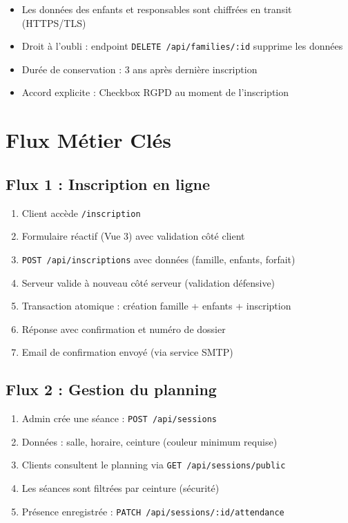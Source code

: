 \documentclass[11pt,a4paper]{article}
\begin{document}
\begin{itemize}
  \item Les données des enfants et responsables sont chiffrées en transit (HTTPS/TLS)
  \item Droit à l'oubli : endpoint \texttt{DELETE /api/families/:id} supprime les données
  \item Durée de conservation : 3 ans après dernière inscription
  \item Accord explicite : Checkbox RGPD au moment de l'inscription
\end{itemize}

\section{Flux Métier Clés}

\subsection{Flux 1 : Inscription en ligne}

\begin{enumerate}
  \item Client accède \texttt{/inscription}
  \item Formulaire réactif (Vue 3) avec validation côté client
  \item \texttt{POST /api/inscriptions} avec données (famille, enfants, forfait)
  \item Serveur valide à nouveau côté serveur (validation défensive)
  \item Transaction atomique : création famille + enfants + inscription
  \item Réponse avec confirmation et numéro de dossier
  \item Email de confirmation envoyé (via service SMTP)
\end{enumerate}

\subsection{Flux 2 : Gestion du planning}

\begin{enumerate}
  \item Admin crée une séance : \texttt{POST /api/sessions}
  \item Données : salle, horaire, ceinture (couleur minimum requise)
  \item Clients consultent le planning via \texttt{GET /api/sessions/public}
  \item Les séances sont filtrées par ceinture (sécurité)
  \item Présence enregistrée : \texttt{PATCH /api/sessions/:id/attendance}
\end{enumerate}
\end{document}
